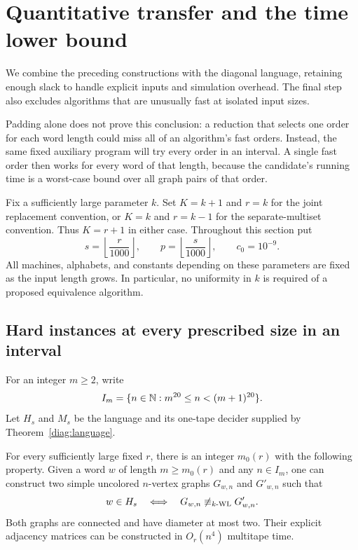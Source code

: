 \section{Quantitative transfer and the time lower bound}
\label{trans:section}

We combine the preceding constructions with the diagonal language, retaining
enough slack to handle explicit inputs and simulation overhead. The final
step also excludes algorithms that are unusually fast at isolated input
sizes.

Padding alone does not prove this conclusion: a reduction that selects
one order for each word length could miss all of an algorithm's fast
orders. Instead, the same fixed auxiliary program will try every order
in an interval. A single fast order then works for every word of that
length, because the candidate's running time is a worst-case bound over
all graph pairs of that order.

Fix a sufficiently large parameter $k$. Set $K=k+1$ and $r=k$ for the joint
replacement convention, or $K=k$ and $r=k-1$ for the separate-multiset
convention. Thus $K=r+1$ in either case. Throughout this section put
\begin{equation}
\label{trans:parameters}
  s=\left\lfloor\frac{r}{1000}\right\rfloor,
  \qquad
  p=\left\lfloor\frac{s}{1000}\right\rfloor,
  \qquad
  c_0=10^{-9}.
\end{equation}
All machines, alphabets, and constants depending on these parameters are
fixed as the input length grows. In particular, no uniformity in $k$ is
required of a proposed equivalence algorithm.

\subsection{Hard instances at every prescribed size in an interval}

For an integer $m\ge 2$, write
\begin{equation}
\label{trans:interval}
  I_m=\{n\in\mathbb{N}:m^{20}\le n<(m+1)^{20}\}.
\end{equation}
Let $H_s$ and $M_s$ be the language and its one-tape decider supplied by
Theorem~\ref{diag:language}.

\begin{lemma}
\label{trans:instances}
For every sufficiently large fixed $r$, there is an integer $m_0(r)$ with
the following property. Given a word $w$ of length $m\ge m_0(r)$ and any
$n\in I_m$, one can construct two simple uncolored $n$-vertex graphs
$G_{w,n}$ and $G'_{w,n}$ such that
\begin{equation}
\label{trans:polarity}
  w\in H_s
  \quad\Longleftrightarrow\quad
  G_{w,n}\not\equiv_{k\text{-}\mathrm{WL}}G'_{w,n}.
\end{equation}
Both graphs are connected and have diameter at most two. Their explicit
adjacency matrices can be constructed in $O_r(n^4)$ multitape time.
\end{lemma}

